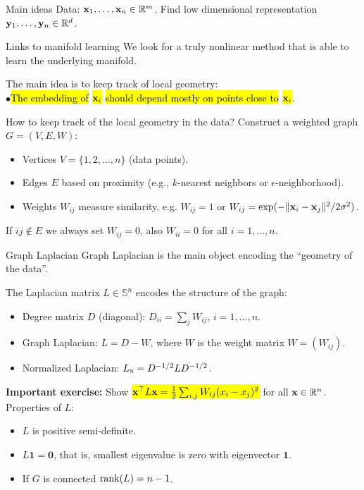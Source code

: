 \documentclass[11pt,handout,aspectratio=169]{beamer}
\begin{document}
\begin{frame}{Main ideas}
Data: $\mathbf{x}_1,\ldots,\mathbf{x}_n\in \mathbb R^m$. Find low dimensional representation $\mathbf{y}_1,\ldots,\mathbf{y}_n\in \mathbb R^d$.
\begin{alertblock}{Links to manifold learning}
	We look for a truly nonlinear method that is able to learn the underlying manifold.
\end{alertblock}
The main idea is to keep track of local geometry:\\ 
\qquad $\bullet$\;\hl{The embedding of }\hl{$\mathbf{x}_i$}\hl{ should depend mostly on points close to }\hl{$\mathbf{x}_i$}.
\begin{block}{How to keep track of the local geometry in the data?}
Construct a weighted graph $G=(V,E,W)$:
    \begin{itemize}
        \item Vertices $V=\{1,2,\ldots,n\}$ (data points).
        \item Edges $E$ based on proximity (e.g., $k$-nearest neighbors or $\epsilon$-neighborhood).
        \item Weights $W_{ij}$ measure similarity, e.g. $W_{ij}=1$ or $W_{ij}=\exp(-\|\mathbf{x}_i-\mathbf{x}_j\|^2/2\sigma^2)$.
    \end{itemize}
\end{block}
If $ij\notin E$ we always set $W_{ij}=0$, also $W_{ii}=0$ for all $i=1,\ldots,n$.
\end{frame}

\begin{frame}{Graph Laplacian}
\alert{Graph Laplacian} is the main object encoding the ``geometry of the data''. 
\begin{alertblock}{The Laplacian matrix $L\in \mathbb S^n$ encodes the structure of the graph:}
	\begin{itemize}
    \item Degree matrix $D$ (diagonal): $D_{ii}=\sum_j W_{ij}$, $i=1,\ldots,n$.
    \item Graph Laplacian: $L = D - W$, where $W$ is the weight matrix $W=(W_{ij})$.
    \item Normalized Laplacian: $L_{\textsc{n}} = D^{-1/2} L D^{-1/2}$.
\end{itemize}
\end{alertblock}
\alert{\textbf{Important exercise:}} Show \hl{$\mathbf{x}^\top L\mathbf{x}=\tfrac12\sum_{i,j} W_{ij}(x_i-x_j)^2$} for all $\mathbf{x}\in \mathbb R^n$.\\[4mm]
Properties of $L$:
\begin{itemize}
    \item $L$ is positive semi-definite.
    \item $L\mathbf 1=\mathbf 0$, that is, smallest eigenvalue is zero with eigenvector $\mathbf{1}$.
    \item If $G$ is connected ${\rm rank}(L)=n-1$.
\end{itemize}
\end{frame}
\end{document}
